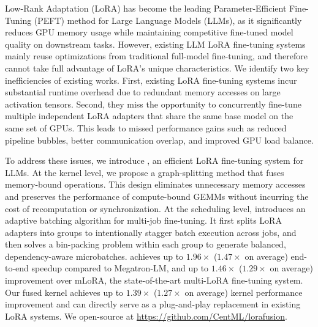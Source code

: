\sloppy
Low-Rank Adaptation (LoRA) has become the leading Parameter-Efficient Fine-Tuning (PEFT) method for Large Language Models (LLMs), as it significantly reduces GPU memory usage while maintaining competitive fine-tuned model quality on downstream tasks.
However, existing LLM LoRA fine-tuning systems mainly reuse optimizations from traditional full-model fine-tuning, and therefore cannot take full advantage of LoRA's unique characteristics.
We identify two key inefficiencies of existing works. 
First, existing LoRA fine-tuning systems incur substantial runtime overhead due to redundant memory accesses on large activation tensors.
Second, they miss the opportunity to concurrently fine-tune multiple independent LoRA adapters that share the same base model on the same set of GPUs. This leads to missed performance gains such as reduced pipeline bubbles, better communication overlap, and improved GPU load balance.

To address these issues, we introduce \Name, an efficient LoRA fine-tuning system for LLMs.
At the kernel level, we propose a graph-splitting method that fuses memory-bound operations. This design eliminates unnecessary memory accesses and preserves the performance of compute-bound GEMMs without incurring the cost of recomputation or synchronization.
At the scheduling level, \Name introduces an adaptive batching algorithm for multi-job fine-tuning. It first splits LoRA adapters into groups to intentionally stagger batch execution across jobs, and then solves a bin-packing problem within each group to generate balanced, dependency-aware microbatches.
\Name achieves up to $1.96\times$ ($1.47\times$ on average) end-to-end speedup compared to Megatron-LM, and up to $1.46\times$ ($1.29\times$ on average) improvement over mLoRA, the state-of-the-art multi-LoRA fine-tuning system.
Our fused kernel achieves up to $1.39\times$ ($1.27\times$ on average) kernel performance improvement and can directly serve as a plug-and-play replacement in existing LoRA systems.
We open-source \Name at \url{https://github.com/CentML/lorafusion}.